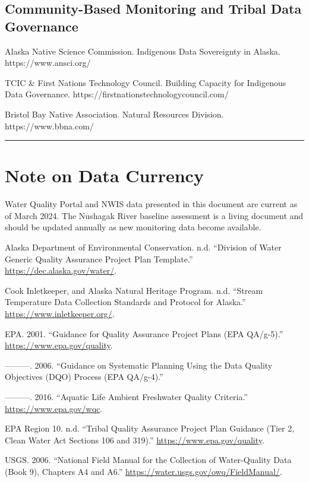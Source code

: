 \documentclass[
  letterpaper,
]{scrbook}
\newlength{\cslhangindent}
\newenvironment{CSLReferences}[2] %
 {\begin{list}{}{%
  \setlength{\itemindent}{0pt}
  \setlength{\leftmargin}{0pt}
  \setlength{\parsep}{0pt}
  \ifodd #1
   \setlength{\leftmargin}{\cslhangindent}
   \setlength{\itemindent}{-1\cslhangindent}
  \fi
  \setlength{\itemsep}{#2\baselineskip}}}
 {\end{list}}
\begin{document}
\subsection{Community-Based Monitoring and Tribal Data
Governance}\label{community-based-monitoring-and-tribal-data-governance}

Alaska Native Science Commission. Indigenous Data Sovereignty in Alaska.
https://www.ansci.org/

TCIC \& First Nations Technology Council. Building Capacity for
Indigenous Data Governance. https://firstnationstechnologycouncil.com/

Bristol Bay Native Association. Natural Resources Division.
https://www.bbna.com/

\begin{center}\rule{0.5\linewidth}{0.5pt}\end{center}

\section{Note on Data Currency}\label{note-on-data-currency}

Water Quality Portal and NWIS data presented in this document are
current as of March 2024. The Nushagak River baseline assessment is a
living document and should be updated annually as new monitoring data
become available.

\label{refs}
\begin{CSLReferences}{1}{0}
Alaska Department of Environmental Conservation. n.d. {``Division of
Water Generic Quality Assurance Project Plan Template.''}
\url{https://dec.alaska.gov/water/}.

Cook Inletkeeper, and Alaska Natural Heritage Program. n.d. {``Stream
Temperature Data Collection Standards and Protocol for Alaska.''}
\url{https://www.inletkeeper.org/}.

EPA. 2001. {``Guidance for Quality Assurance Project Plans (EPA
QA/g-5).''} \url{https://www.epa.gov/quality}.

---------. 2006. {``Guidance on Systematic Planning Using the Data
Quality Objectives (DQO) Process (EPA QA/g-4).''}

---------. 2016. {``Aquatic Life Ambient Freshwater Quality Criteria.''}
\url{https://www.epa.gov/wqc}.

EPA Region 10. n.d. {``Tribal Quality Assurance Project Plan Guidance
(Tier 2, Clean Water Act Sections 106 and 319).''}
\url{https://www.epa.gov/quality}.

USGS. 2006. {``National Field Manual for the Collection of Water-Quality
Data (Book 9), Chapters A4 and A6.''}
\url{https://water.usgs.gov/owq/FieldManual/}.

\end{CSLReferences}


\backmatter
\end{document}
